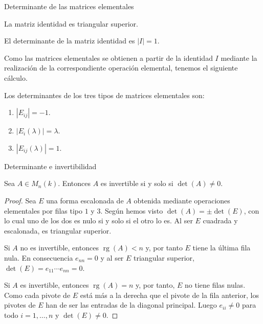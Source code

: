 \begin{frame}{Determinante de las matrices elementales}

La matriz identidad es triangular superior.

\begin{corollary}
	El determinante de la matriz identidad es $|I|=1$.
\end{corollary}

Como las matrices elementales se obtienen a partir de la identidad $I$ mediante la realización de la correspondiente operación elemental, tenemos el siguiente cálculo.

\begin{corollary}
	Los determinantes de los tres tipos de matrices elementales son:
	\begin{enumerate}
		\item $| E_{ij} |=-1$.
		\item $| E_i(\lambda) |=\lambda$.
		\item $| E_{ij}(\lambda) |=1$.
	\end{enumerate}
\end{corollary}

\end{frame}

\begin{frame}[allowframebreaks, t]{Determinante e invertibilidad}

\begin{theorem}
Sea \(A\in M_n(k)\). Entonces
\(A\) es invertible si y solo si
\(
\det(A)\neq0.
\)
\end{theorem}

\begin{proof}
Sea $E$ una forma escalonada de \(A\) obtenida mediante operaciones elementales por filas tipo $1$ y $3$. Según hemos visto $\det(A)=\pm\det(E)$, con lo cual uno de los dos es nulo si y solo si el otro lo es. Al ser $E$ cuadrada y escalonada, es triangular superior.

\medskip

Si \(A\) no es invertible, entonces \(\operatorname{rg}(A)<n\) y, por tanto $E$ tiene la última fila nula. En consecuencia $e_{nn}=0$ y al ser \(E\) triangular superior, \(\det(E)=e_{11}\cdots e_{nn}=0\).

\medskip

Si \(A\) es invertible, entonces \(\operatorname{rg}(A)=n\) y, por tanto, \(E\) no tiene filas nulas. Como cada pivote de $E$ está más a la derecha que el pivote de la fila anterior, los pivotes de $E$ han  de ser las entradas de la diagonal principal. Luego $e_{ii}\neq0$ para todo \(i=1,\ldots,n\) y $\det(E)\neq 0$.
\end{proof}

\end{frame}

